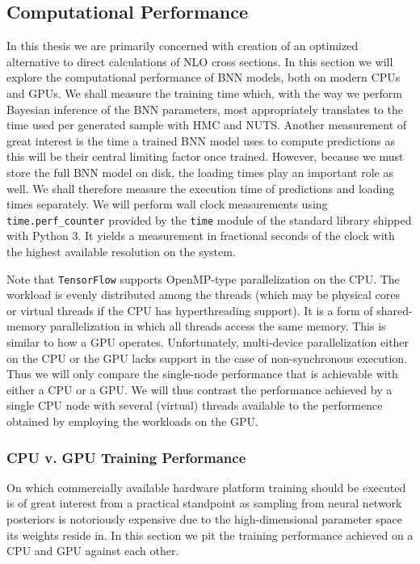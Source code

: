 \subsection{Computational Performance}
In this thesis we are primarily concerned with creation of an optimized alternative to direct calculations of NLO cross sections.
In this section we will explore the computational performance of BNN models, both on modern CPUs and GPUs. We shall measure the training time which, with the way we perform Bayesian inference of the BNN parameters, most appropriately translates to the time used per generated sample with HMC and NUTS. Another measurement of great interest is the time a trained BNN model uses to compute predictions as this will be their central limiting factor once trained. However, because we must store the full BNN model on disk, the loading times play an important role as well. We shall therefore measure the execution time of predictions and loading times separately.
We will perform wall clock measurements using {\tt time.perf\_counter} provided by the {\tt time} module of the standard library shipped with Python 3. It yields a measurement in fractional seconds of the clock with the highest available resolution on the system.

Note that {\tt TensorFlow} supports OpenMP-type parallelization on the CPU. The workload is evenly distributed among the threads (which may be physical cores or virtual threads if the CPU has hyperthreading support). It is a form of shared-memory parallelization in which all threads access the same memory. This is similar to how a GPU operates.
Unfortunately, multi-device parallelization either on the CPU or the GPU lacks support in the case of non-synchronous execution. Thus we will only compare the single-node performance that is achievable with either a CPU or a GPU. We will thus contrast the performance achieved by a single CPU node with several (virtual) threads available to the performence obtained by employing the workloads on the GPU.

\subsubsection{CPU v. GPU Training Performance}
On which commercially available hardware platform training should be executed is of great interest from a practical standpoint as 
sampling from neural network posteriors is notoriously expensive due to the high-dimensional parameter space its weights reside in.
In this section we pit the training performance achieved on a CPU and GPU against each other.

